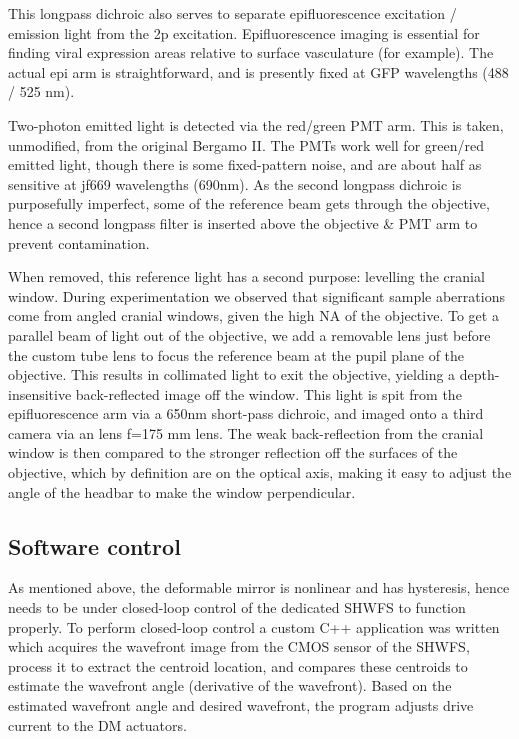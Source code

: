 \documentclass[a4paper,10pt]{article}
\begin{document}
This longpass dichroic also serves to separate epifluorescence excitation / emission light from the 2p excitation.  Epifluorescence imaging is essential for finding viral expression areas relative to surface vasculature (for example).  The actual epi arm is straightforward, and is presently fixed at GFP wavelengths (488 / 525 nm).  

Two-photon emitted light is detected via the red/green PMT arm.  This is taken, unmodified, from the original Bergamo II.  The PMTs work well for green/red emitted light, though there is some fixed-pattern noise, and are about half as sensitive at jf669 wavelengths (690nm).  As the second longpass dichroic is purposefully imperfect, some of the reference beam gets through the objective, hence a second longpass filter is inserted above the objective \& PMT arm to prevent contamination.  

When removed, this reference light has a second purpose: levelling the cranial window.  During experimentation we observed that significant sample aberrations come from angled cranial windows,  given the high NA of the objective.  To get a parallel beam of light out of the objective, we add a removable lens just before the custom tube lens to focus the reference beam at the pupil plane of the objective.  This results in collimated light to exit the objective, yielding a depth-insensitive back-reflected image off the window.  This light is spit from the epifluorescence arm via a 650nm short-pass dichroic, and imaged onto a third camera via an lens f=175 mm lens.  The weak back-reflection from the cranial window is then compared to the stronger reflection off the surfaces of the objective, which by definition are on the optical axis, making it easy to adjust the angle of the headbar to make the window perpendicular.  

\subsection{Software control}

As mentioned above, the deformable mirror is nonlinear and has hysteresis, hence needs to be under closed-loop control of the dedicated SHWFS to function properly.  To perform closed-loop control a custom C++ application was written which acquires the wavefront image from the CMOS sensor of the SHWFS, process it to extract the centroid location, and compares these centroids to estimate the wavefront angle (derivative of the wavefront).  Based on the estimated wavefront angle and desired wavefront, the program adjusts drive current to the DM actuators.  
\end{document}
